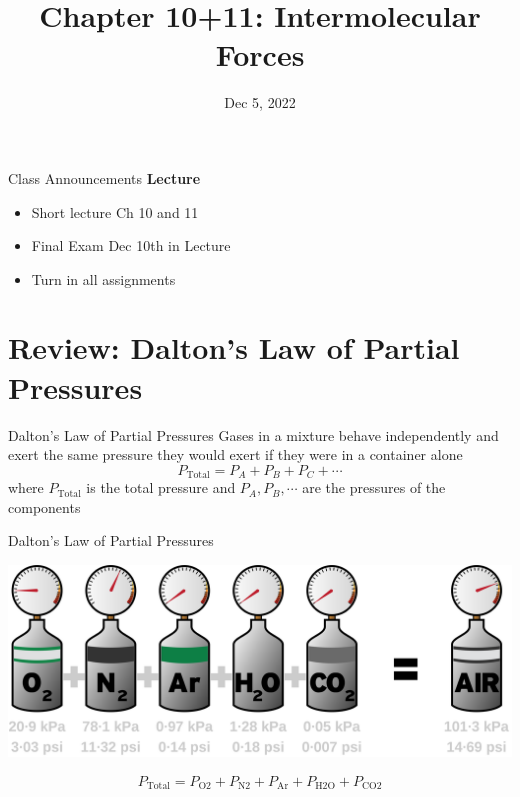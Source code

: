 \documentclass[11pt]{beamer}
\title{Chapter 10+11: Intermolecular Forces}
\institute{Chemistry Department, Cypress College}
\date{Dec 5, 2022}
\begin{document}
\begin{frame}
  \titlepage
\end{frame}

\begin{frame}{Class Announcements}
  \textbf{Lecture}
  \begin{itemize}
  \item Short lecture Ch 10 and 11
  \item Final Exam Dec 10th in Lecture
  \item Turn in all assignments
  \end{itemize}
\end{frame}

\section{Review: Dalton's Law of Partial Pressures}

\begin{frame}{Dalton's Law of Partial Pressures}
  Gases in a mixture behave independently and exert the same pressure they would
  exert if they were in a container alone
  \begin{equation}
    P_\text{Total} = P_A + P_B + P_C + \cdots
  \end{equation}
  where $P_\text{Total}$ is the total pressure and $P_A, P_B, \cdots$ are the
  pressures of the components
\end{frame}

\begin{frame}{Dalton's Law of Partial Pressures}
  \begin{center}
    \includegraphics[width=\linewidth]{dalton_partial}
  \end{center}
  \begin{equation}
    P_\text{Total} = P_\text{O2} + P_\text{N2} + P_\text{Ar}
    + P_\text{H2O} + P_\text{CO2}
    \nonumber
  \end{equation}
\end{frame}
\end{document}
